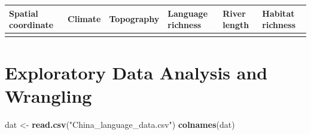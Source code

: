 \documentclass[12pt,]{article}
\newenvironment{Shaded}{\begin{snugshade}}{\end{snugshade}}
\newcommand{\KeywordTok}[1]{\textcolor[rgb]{0.13,0.29,0.53}{\textbf{#1}}}
\newcommand{\StringTok}[1]{\textcolor[rgb]{0.31,0.60,0.02}{#1}}
\newcommand{\NormalTok}[1]{#1}
\begin{document}
\begin{longtable}[]{@{}llllll@{}}
\toprule
\begin{minipage}[b]{0.18\columnwidth}\raggedright\strut
Spatial coordinate\strut
\end{minipage} & \begin{minipage}[b]{0.08\columnwidth}\raggedright\strut
Climate\strut
\end{minipage} & \begin{minipage}[b]{0.11\columnwidth}\raggedright\strut
Topography\strut
\end{minipage} & \begin{minipage}[b]{0.17\columnwidth}\raggedright\strut
Language richness\strut
\end{minipage} & \begin{minipage}[b]{0.13\columnwidth}\raggedright\strut
River length\strut
\end{minipage} & \begin{minipage}[b]{0.16\columnwidth}\raggedright\strut
Habitat richness\strut
\end{minipage}\tabularnewline
\midrule
\endhead
\begin{minipage}[t]{0.18\columnwidth}\raggedright\strut
\strut
\end{minipage} & \begin{minipage}[t]{0.08\columnwidth}\raggedright\strut
\strut
\end{minipage} & \begin{minipage}[t]{0.11\columnwidth}\raggedright\strut
\strut
\end{minipage} & \begin{minipage}[t]{0.17\columnwidth}\raggedright\strut
\strut
\end{minipage} & \begin{minipage}[t]{0.13\columnwidth}\raggedright\strut
\strut
\end{minipage}\tabularnewline
\bottomrule
\end{longtable}

\newpage

\section{Exploratory Data Analysis and
Wrangling}\label{exploratory-data-analysis-and-wrangling}

\begin{Shaded}
\begin{Highlighting}[]
\NormalTok{dat <-}\StringTok{ }\KeywordTok{read.csv}\NormalTok{(}\StringTok{"China_language_data.csv"}\NormalTok{)}
\KeywordTok{colnames}\NormalTok{(dat)}
\end{Highlighting}
\end{Shaded}
\end{document}
